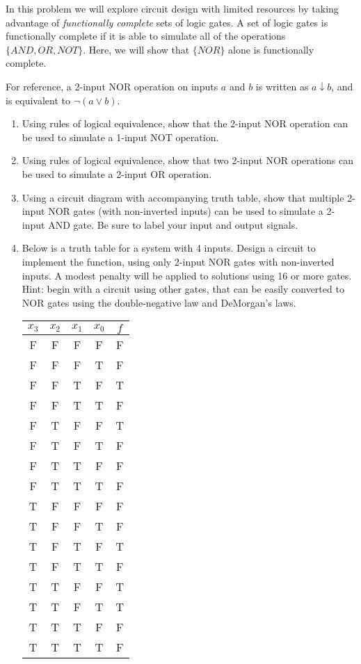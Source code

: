 \item[14] In this problem we will explore circuit design with limited resources by taking advantage of \textit {functionally complete} sets of logic gates. A set of logic gates is functionally complete if it is able to simulate all of the operations $\{AND, OR, NOT\}$. Here, we will show that $\{NOR\}$ alone is functionally complete.

For reference, a 2-input NOR operation on inputs $a$ and $b$ is written as $a \downarrow b$, and is equivalent to $\lnot (a \lor b)$.

\begin{enumerate}
    \item Using rules of logical equivalence, show that the 2-input NOR operation can be used to simulate a 1-input NOT operation.
    \vspace{1.0in}
    \item Using rules of logical equivalence, show that two 2-input NOR operations can be used to simulate a 2-input OR operation.
    \vspace{2.0in}
    \item Using a circuit diagram with accompanying truth table, show that multiple 2-input NOR gates (with non-inverted inputs) can be used to simulate a 2-input AND gate. Be sure to label your input and output signals.
    \vspace{2.5in}
    
    \newpage
    
    \item Below is a truth table for a system with 4 inputs. Design a circuit to implement the function, using only 2-input NOR gates with non-inverted inputs. A modest penalty will be applied to solutions using 16 or more gates. Hint: begin with a circuit using other gates, that can be easily converted to NOR gates using the double-negative law and DeMorgan's laws.
    
    \begin{tabular}{cccc|c}
      $x_3$ & $x_2$ & $x_1$ & $x_0$ & $f$ \\
      \hline
      F & F & F & F & F \\
      F & F & F & T & F \\
      F & F & T & F & T \\
      F & F & T & T & F \\
      \hline
      F & T & F & F & T \\
      F & T & F & T & F \\
      F & T & T & F & F \\
      F & T & T & T & F \\
      \hline
      T & F & F & F & F \\
      T & F & F & T & F \\
      T & F & T & F & T \\
      T & F & T & T & F \\
      \hline
      T & T & F & F & T \\
      T & T & F & T & T \\
      T & T & T & F & F \\
      T & T & T & T & F \\
    \end{tabular}
    
\end{enumerate}

\newpage